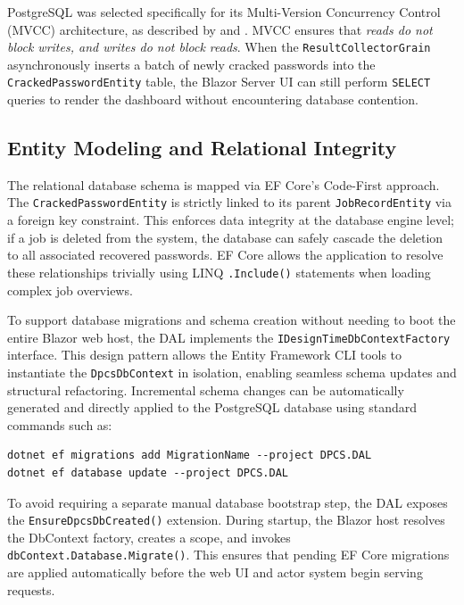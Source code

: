 PostgreSQL was selected specifically for its Multi-Version Concurrency Control (MVCC) architecture, as described by \cite{enwiki:1353064384} and \cite{enwiki:1317946678}. MVCC ensures that \textit{reads do not block writes, and writes do not block reads}. When the \verb|ResultCollectorGrain| asynchronously inserts a batch of newly cracked passwords into the \verb|CrackedPasswordEntity| table, the Blazor Server UI can still perform \verb|SELECT| queries to render the dashboard without encountering database contention.

\subsection{Entity Modeling and Relational Integrity}
The relational database schema is mapped via EF Core's Code-First approach. The \verb|CrackedPasswordEntity| is strictly linked to its parent \verb|JobRecordEntity| via a foreign key constraint. This enforces data integrity at the database engine level; if a job is deleted from the system, the database can safely cascade the deletion to all associated recovered passwords. EF Core allows the application to resolve these relationships trivially using LINQ \verb|.Include()| statements when loading complex job overviews.

To support database migrations and schema creation without needing to boot the entire Blazor web host, the DAL implements the \verb|IDesignTimeDbContextFactory| interface. This design pattern allows the Entity Framework CLI tools \cite{ef_core_migrations} to instantiate the \verb|DpcsDbContext| in isolation, enabling seamless schema updates and structural refactoring. Incremental schema changes can be automatically generated and directly applied to the PostgreSQL database using standard commands such as:

\begin{verbatim}
dotnet ef migrations add MigrationName --project DPCS.DAL
dotnet ef database update --project DPCS.DAL
\end{verbatim}

To avoid requiring a separate manual database bootstrap step, the DAL exposes the \verb|EnsureDpcsDbCreated()| extension. During startup, the Blazor host resolves the DbContext factory, creates a scope, and invokes \verb|dbContext.Database.Migrate()|. This ensures that pending EF Core migrations are applied automatically before the web UI and actor system begin serving requests.




